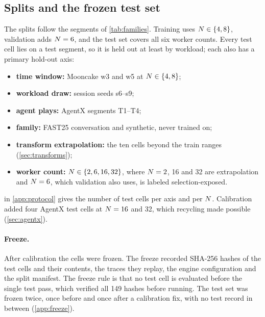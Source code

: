 \subsection{Splits and the frozen test set}
\label{sec:freeze}

The splits follow the segments of \cref{tab:families}. Training uses $N \in \{4, 8\}$,
validation adds $N = 6$, and the test set covers all six worker counts. Every test cell lies on a
test segment, so it is held out at least by workload; each also has a primary hold-out axis:
\begin{itemize}
  \item \textbf{time window:} Mooncake w3 and w5 at $N \in \{4, 8\}$;
  \item \textbf{workload draw:} session seeds s6--s9;
  \item \textbf{agent plays:} AgentX segments T1--T4;
  \item \textbf{family:} FAST25 conversation and synthetic, never trained on;
  \item \textbf{transform extrapolation:} the ten cells beyond the train ranges
    (\cref{sec:transforms});
  \item \textbf{worker count:} $N \in \{2, 6, 16, 32\}$, where $N = 2$, 16 and 32 are
    extrapolation and $N = 6$, which validation also uses, is labeled selection-exposed.
\end{itemize}
 in \cref{app:protocol} gives the number of test cells per axis and per $N$. Calibration added four
AgentX test cells at $N = 16$ and 32, which recycling made possible (\cref{sec:agentx}).

\paragraph{Freeze.}
After calibration the cells were frozen. %
The freeze recorded SHA-256 hashes of the test cells and their contents, the traces they replay,
the engine configuration and the split manifest. The freeze rule is that no test cell is evaluated
before the single test pass, which verified all 149 hashes before running. The test set was frozen
twice, once before and once after a calibration fix, with no test record in between
(\cref{app:freeze}).
